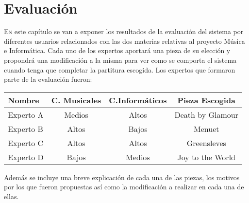 \chapter{Evaluación}
\label{chap:evaluation}
\vspace{0.5cm}


 \lettrine{E}{n} este capítulo se van a exponer los resultados de la evaluación del sistema por diferentes usuarios relacionados con las dos materias relativas al proyecto Música e Informática. Cada uno de los expertos aportará una pieza de su elección y propondrá una modificación a la misma para ver como se comporta el sistema cuando tenga que completar la partitura escogida. Los expertos que formaron parte de la evaluación fueron:
 
 \begin{center}
 	\begin{tabular}{ | l | c | c | c |}
 		\hline
 		Nombre & C. Musicales & C.Informáticos & Pieza Escogida \\ \hline \hline
 		Experto A & Medios & Altos &  Death by Glamour \\ \hline
 		Experto B & Altos & Bajos & Menuet \\ \hline
 		Experto C & Altos & Altos & Greensleves \\ \hline
 		Experto D & Bajos & Medios & Joy to the World \\ \hline
 	\end{tabular}
 \end{center}
 
 Además se incluye una breve explicación de cada una de las piezas, los motivos por los que fueron propuestas así como la modificación a realizar en cada una de ellas.
 
